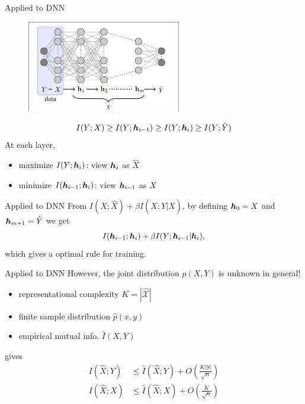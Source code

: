 \documentclass[xcolor={svgnames}]{beamer}
\begin{document}
\begin{frame}{Applied to DNN}
	\begin{figure}[hp]
		\centering
		\includegraphics[width=0.6\textwidth]{figures/dnn.png}
	\end{figure}
	\[
		I(Y;X) \ge I(Y;\boldsymbol{h}_{i-1}) \ge I(Y;\boldsymbol{h}_i) \ge I(Y;\hat{Y})
	\]
	\pause
	At each layer,
	\begin{itemize}
		\item maximize $I(Y;\boldsymbol{h}_i)$: view $\boldsymbol{h}_i$ as $\hat{X}$
		\item minimize $I(\boldsymbol{h}_{i-1};\boldsymbol{h}_i)$: view $\boldsymbol{h}_{i-1}$ as $X$
	\end{itemize}
\end{frame}


\begin{frame}{Applied to DNN}
	From $I( X;\hat{X} ) + \beta I( X;Y | \hat{X} )$, by defining $\boldsymbol{h}_0 = X$ and $\boldsymbol{h}_{m+1} = \hat{Y}$ we get
	\[
		I( \boldsymbol{h}_{i-1};\boldsymbol{h}_i ) + \beta I( Y;\boldsymbol{h}_{i-1} | \boldsymbol{h}_i),
	\]
	which gives a optimal rule for training.
\end{frame}


\begin{frame}{Applied to DNN}
	However, the joint distribution $p(X,Y)$ is unknown in general!
	\begin{itemize}
		\item representational complexity $K = |\hat{\mathcal{X}}|$
		\item finite sample distribution $\hat{p}(x,y)$
		\item empirical mutual info. $\hat{I}(X,Y)$
	\end{itemize}
	\cite{shamir2010learning} gives
	\[
	\begin{split}
		I\left(\hat{X};Y\right) &\le \hat{I}\left(\hat{X};Y\right) + O\left(\frac{K |\mathcal{Y}|}{\sqrt{n}}\right) \\
		I\left(\hat{X};X\right) &\le \hat{I}\left(\hat{X};X\right) + O\left(\frac{K}{\sqrt{n}}\right)
	\end{split}
	\]
\end{frame}
\end{document}
